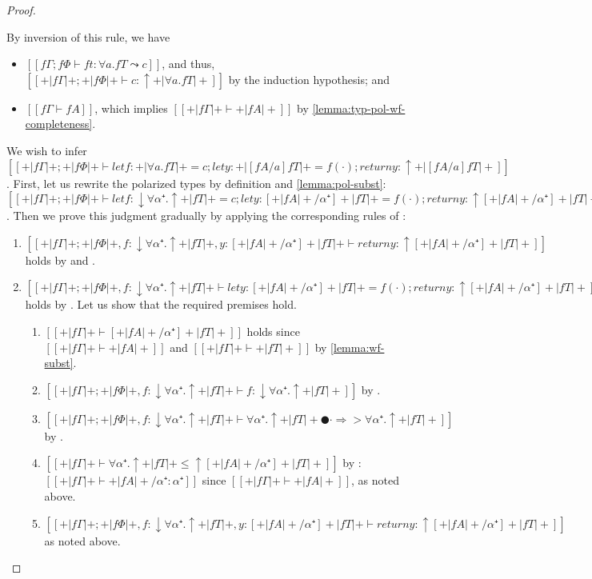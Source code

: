 \begin{proof}
\begin{caseof}
    \item {}
      By inversion of this rule, we have
      \begin{itemize}
        \item $[[fΓ ; fΦ ⊢ ft : ∀a.fT  ⤳  c]]$, and thus, 
          $[[+|fΓ|+ ; +|fΦ|+ ⊢ c : ↑+|∀a.fT|+]]$ by the induction hypothesis; and
        \item $[[fΓ ⊢ fA]]$, which implies $[[+|fΓ|+ ⊢ +|fA|+]]$ by \cref{lemma:typ-pol-wf-completeness}.
      \end{itemize}
      We wish to infer
      $[[+|fΓ|+ ; +|fΦ|+ ⊢ let f : +|∀a.fT|+ = c; let y : +|[fA/a]fT|+ = f(·); return y : ↑+|[fA/a]fT|+]]$.
      First, let us rewrite the polarized types by definition and \cref{lemma:pol-subst}:
      $[[+|fΓ|+ ; +|fΦ|+ ⊢ let f : ↓∀α⁺.↑+|fT|+ = c; let y : [+|fA|+/α⁺]+|fT|+ = f(·); return y : ↑[+|fA|+/α⁺]+|fT|+]]$.
      Then we prove this judgment gradually by applying the corresponding rules of \fexists:
      \begin{enumerate}
        \item $[[+|fΓ|+ ; +|fΦ|+, f : ↓∀α⁺.↑+|fT|+, y : [+|fA|+/α⁺]+|fT|+ ⊢ return y : ↑[+|fA|+/α⁺]+|fT|+]]$
          holds by  and .
        \item $[[+|fΓ|+ ; +|fΦ|+, f : ↓∀α⁺.↑+|fT|+  ⊢ let y : [+|fA|+/α⁺]+|fT|+ = f(·); return y : ↑[+|fA|+/α⁺]+|fT|+]]$
          holds by . Let us show that the 
          required premises hold. 
          \begin{enumerate}
            \item $[[+|fΓ|+ ⊢ [+|fA|+/α⁺]+|fT|+]]$ holds since $[[+|fΓ|+ ⊢ +|fA|+]]$ and $[[+|fΓ|+ ⊢ +|fT|+]]$ by \cref{lemma:wf-subst}.
            \item $[[+|fΓ|+ ; +|fΦ|+, f : ↓∀α⁺.↑+|fT|+  ⊢ f : ↓∀α⁺.↑+|fT|+]]$ by .
            \item $[[+|fΓ|+ ; +|fΦ|+, f : ↓∀α⁺.↑+|fT|+  ⊢ ∀α⁺.↑+|fT|+ ● · ⇒> ∀α⁺.↑+|fT|+]]$ by .
            \item $[[+|fΓ|+  ⊢ ∀α⁺.↑+|fT|+ ≤ ↑[+|fA|+/α⁺]+|fT|+ ]]$ by :
              $[[+|fΓ|+  ⊢ +|fA|+/α⁺ : {α⁺}]]$ since $[[+|fΓ|+  ⊢ +|fA|+]]$, as noted above.
            \item $[[+|fΓ|+ ; +|fΦ|+, f : ↓∀α⁺.↑+|fT|+, y : [+|fA|+/α⁺]+|fT|+ ⊢ return y : ↑[+|fA|+/α⁺]+|fT|+]]$ as noted above.
          \end{enumerate}

\end{enumerate}
\end{caseof}
\end{proof}

